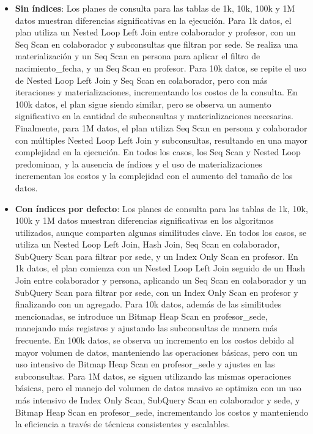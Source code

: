 \begin{itemize}
\begin{itemize}
		      \item {\textbf{Sin índices}: Los planes de consulta para las tablas de 1k, 10k, 100k y 1M datos muestran diferencias significativas en la ejecución. Para 1k datos, el plan utiliza un Nested Loop Left Join entre colaborador y profesor, con un Seq Scan en colaborador y subconsultas que filtran por sede. Se realiza una materialización y un Seq Scan en persona para aplicar el filtro de nacimiento\_fecha, y un Seq Scan en profesor. Para 10k datos, se repite el uso de Nested Loop Left Join y Seq Scan en colaborador, pero con más iteraciones y materializaciones, incrementando los costos de la consulta. En 100k datos, el plan sigue siendo similar, pero se observa un aumento significativo en la cantidad de subconsultas y materializaciones necesarias. Finalmente, para 1M datos, el plan utiliza Seq Scan en persona y colaborador con múltiples Nested Loop Left Join y subconsultas, resultando en una mayor complejidad en la ejecución. En todos los casos, los Seq Scan y Nested Loop predominan, y la ausencia de índices y el uso de materializaciones incrementan los costos y la complejidad con el aumento del tamaño de los datos.}
		      \item {\textbf{Con índices por defecto}: Los planes de consulta para las tablas de 1k, 10k, 100k y 1M datos muestran diferencias significativas en los algoritmos utilizados, aunque comparten algunas similitudes clave. En todos los casos, se utiliza un Nested Loop Left Join, Hash Join, Seq Scan en colaborador, SubQuery Scan para filtrar por sede, y un Index Only Scan en profesor. En 1k datos, el plan comienza con un Nested Loop Left Join seguido de un Hash Join entre colaborador y persona, aplicando un Seq Scan en colaborador y un SubQuery Scan para filtrar por sede, con un Index Only Scan en profesor y finalizando con un agregado. Para 10k datos, además de las similitudes mencionadas, se introduce un Bitmap Heap Scan en profesor\_sede, manejando más registros y ajustando las subconsultas de manera más frecuente. En 100k datos, se observa un incremento en los costos debido al mayor volumen de datos, manteniendo las operaciones básicas, pero con un uso intensivo de Bitmap Heap Scan en profesor\_sede y ajustes en las subconsultas. Para 1M datos, se siguen utilizando las mismas operaciones básicas, pero el manejo del volumen de datos masivo se optimiza con un uso más intensivo de Index Only Scan, SubQuery Scan en colaborador y sede, y Bitmap Heap Scan en profesor\_sede, incrementando los costos y manteniendo la eficiencia a través de técnicas consistentes y escalables.}

\end{itemize}
\end{itemize}
